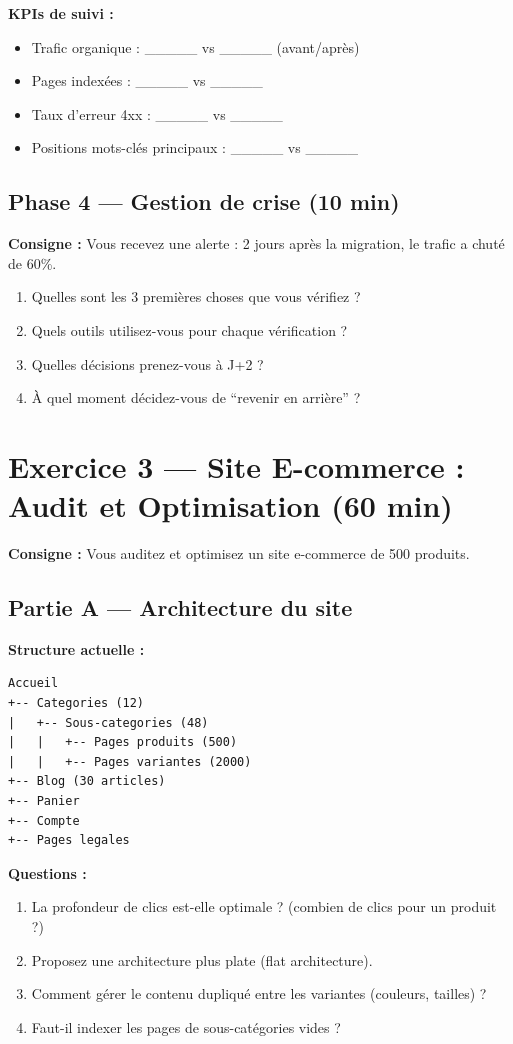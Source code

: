 \documentclass[12pt,a4paper]{report}
\begin{document}
\textbf{KPIs de suivi :}
\begin{itemize}
\item Trafic organique : \_\_\_\_\_ vs \_\_\_\_\_ (avant/après)
\item Pages indexées : \_\_\_\_\_ vs \_\_\_\_\_
\item Taux d'erreur 4xx : \_\_\_\_\_ vs \_\_\_\_\_
\item Positions mots-clés principaux : \_\_\_\_\_ vs \_\_\_\_\_
\end{itemize}

\subsection{Phase 4 --- Gestion de crise (10 min)}

\textbf{Consigne :} Vous recevez une alerte : 2 jours après la migration, le trafic a chuté de 60\%.

\begin{enumerate}
\item Quelles sont les 3 premières choses que vous vérifiez ?
\item Quels outils utilisez-vous pour chaque vérification ?
\item Quelles décisions prenez-vous à J+2 ?
\item À quel moment décidez-vous de ``revenir en arrière'' ?
\end{enumerate}

\section{Exercice 3 --- Site E-commerce : Audit et Optimisation (60 min)}

\textbf{Consigne :} Vous auditez et optimisez un site e-commerce de 500 produits.

\subsection{Partie A --- Architecture du site}

\textbf{Structure actuelle :}
\begin{lstlisting}
Accueil
+-- Categories (12)
|   +-- Sous-categories (48)
|   |   +-- Pages produits (500)
|   |   +-- Pages variantes (2000)
+-- Blog (30 articles)
+-- Panier
+-- Compte
+-- Pages legales
\end{lstlisting}

\textbf{Questions :}
\begin{enumerate}
\item La profondeur de clics est-elle optimale ? (combien de clics pour un produit ?)
\item Proposez une architecture plus plate (flat architecture).
\item Comment gérer le contenu dupliqué entre les variantes (couleurs, tailles) ?
\item Faut-il indexer les pages de sous-catégories vides ?
\end{enumerate}
\end{document}
